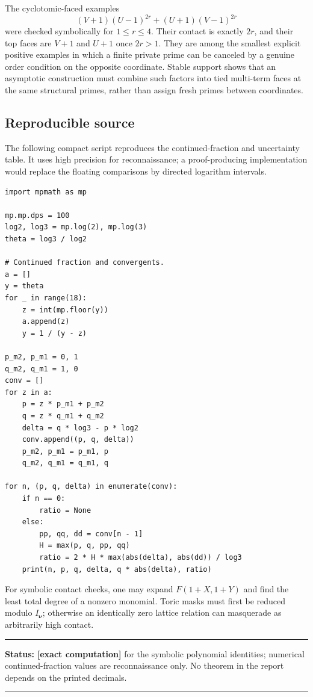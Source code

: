 \documentclass[11pt,oneside]{article}
\theoremstyle{definition}
\theoremstyle{remark}
\newcommand{\statuscomp}{\textcolor{targetviolet}{\textbf{[exact computation]}}}
\newenvironment{statusbox}[1]
{\begin{center}\begin{minipage}{0.94\textwidth}\raggedright\hrule\vspace{0.45em}
\textbf{Status:} #1\par\vspace{0.35em}}
{\vspace{0.35em}\hrule\end{minipage}\end{center}}
\begin{document}
The cyclotomic-faced examples
\[
 (V+1)(U-1)^{2r}+(U+1)(V-1)^{2r}
\]
were checked symbolically for $1\le r\le4$.  Their contact is exactly $2r$, and their top
faces are $V+1$ and $U+1$ once $2r>1$.  They are among the smallest explicit positive examples in which a finite private prime can
be canceled by a genuine order condition on the opposite coordinate.  Stable support shows
that an asymptotic construction must combine such factors into tied multi-term faces at the
same structural primes, rather than assign fresh primes between coordinates.

\subsection{Reproducible source}

The following compact script reproduces the continued-fraction and uncertainty table.  It
uses high precision for reconnaissance; a proof-producing implementation would replace the
floating comparisons by directed logarithm intervals.

\begin{lstlisting}[style=pythonstyle,caption={Continued-fraction and uncertainty reconnaissance.}]
import mpmath as mp

mp.mp.dps = 100
log2, log3 = mp.log(2), mp.log(3)
theta = log3 / log2

# Continued fraction and convergents.
a = []
y = theta
for _ in range(18):
    z = int(mp.floor(y))
    a.append(z)
    y = 1 / (y - z)

p_m2, p_m1 = 0, 1
q_m2, q_m1 = 1, 0
conv = []
for z in a:
    p = z * p_m1 + p_m2
    q = z * q_m1 + q_m2
    delta = q * log3 - p * log2
    conv.append((p, q, delta))
    p_m2, p_m1 = p_m1, p
    q_m2, q_m1 = q_m1, q

for n, (p, q, delta) in enumerate(conv):
    if n == 0:
        ratio = None
    else:
        pp, qq, dd = conv[n - 1]
        H = max(p, q, pp, qq)
        ratio = 2 * H * max(abs(delta), abs(dd)) / log3
    print(n, p, q, delta, q * abs(delta), ratio)
\end{lstlisting}

For symbolic contact checks, one may expand $F(1+X,1+Y)$ and find the least total degree of a
nonzero monomial.  Toric masks must first be reduced modulo $I_{\boldsymbol\nu}$; otherwise an
identically zero lattice relation can masquerade as arbitrarily high contact.

\begin{statusbox}{\statuscomp{} for the symbolic polynomial identities; numerical
continued-fraction values are reconnaissance only.  No theorem in the report depends on the
printed decimals.}
\end{statusbox}
\end{document}

